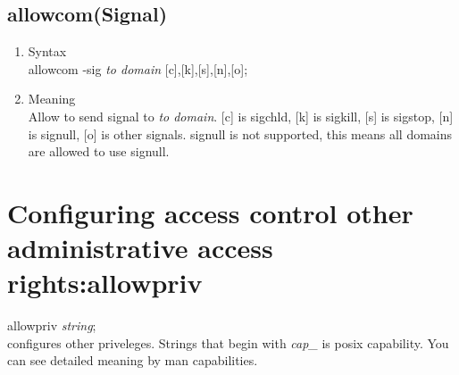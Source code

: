 \documentclass{article}
\begin{document}
\subsection{allowcom(Signal)}
\begin{enumerate}
 \item Syntax\\
       allowcom -sig {\it to domain} [c],[k],[s],[n],[o];
 \item Meaning\\
       Allow to send signal to {\it to domain}. [c] is sigchld, [k] is
       sigkill, [s] is sigstop, [n] is signull, [o] is other signals. signull is not
       supported, this means all domains are allowed to use signull.
\end{enumerate}



\section{Configuring access control other administrative access
  rights:allowpriv}
allowpriv {\it string};\\
configures other priveleges.
Strings that begin with {\it cap\_} is posix capability. You can see
detailed meaning by man capabilities.
\end{document}
